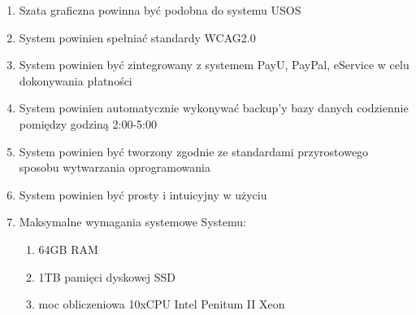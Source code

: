 \documentclass{article}
\begin{document}
\begin{enumerate}
	\item Szata graficzna powinna być podobna do systemu USOS
	\item System powinien spełniać standardy WCAG2.0
	\item System powinien być zintegrowany z systemem PayU, PayPal, eService w celu dokonywania płatności
	\item System powinien automatycznie wykonywać backup’y bazy danych codziennie pomiędzy godziną 2:00-5:00
	\item System powinien być tworzony zgodnie ze standardami przyrostowego sposobu  wytwarzania oprogramowania
	\item System powinien być prosty i intuicyjny w użyciu
	\item Maksymalne wymagania systemowe Systemu:
	\begin{enumerate}
		\item 64GB RAM
		\item 1TB pamięci dyskowej SSD
		\item moc obliczeniowa 10xCPU Intel Penitum II Xeon
	\end{enumerate}

	
\end{enumerate}
\end{document}
